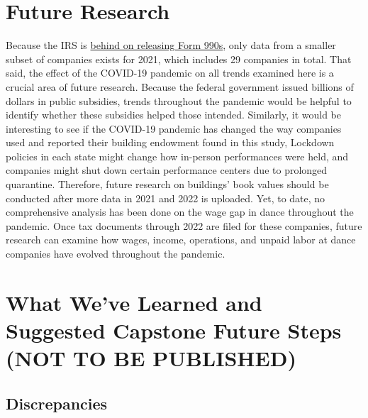 \documentclass[Dance Data
Project,article,submit,moreauthors,pdftex]{mdpi}
\begin{document}
\hypertarget{future-research}{%
\section{Future Research}\label{future-research}}

Because the IRS is
\href{https://www.propublica.org/article/irs-hasnt-released-nearly-half-million-nonprofit-tax-records}{behind
on releasing Form 990s}, only data from a smaller subset of companies
exists for 2021, which includes 29 companies in total. That said, the
effect of the COVID-19 pandemic on all trends examined here is a crucial
area of future research. Because the federal government issued billions
of dollars in public subsidies, trends throughout the pandemic would be
helpful to identify whether these subsidies helped those intended.
Similarly, it would be interesting to see if the COVID-19 pandemic has
changed the way companies used and reported their building endowment
found in this study, Lockdown policies in each state might change how
in-person performances were held, and companies might shut down certain
performance centers due to prolonged quarantine. Therefore, future
research on buildings' book values should be conducted after more data
in 2021 and 2022 is uploaded. Yet, to date, no comprehensive analysis
has been done on the wage gap in dance throughout the pandemic. Once tax
documents through 2022 are filed for these companies, future research
can examine how wages, income, operations, and unpaid labor at dance
companies have evolved throughout the pandemic.

\hypertarget{what-weve-learned-and-suggested-capstone-future-steps-not-to-be-published}{%
\section{What We've Learned and Suggested Capstone Future Steps (NOT TO
BE
PUBLISHED)}\label{what-weve-learned-and-suggested-capstone-future-steps-not-to-be-published}}

\hypertarget{discrepancies}{%
\subsection{Discrepancies}\label{discrepancies}}
\end{document}
